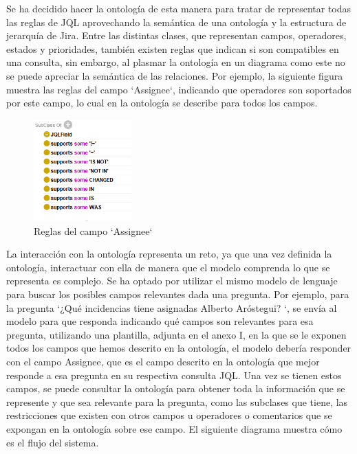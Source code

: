 Se ha decidido hacer la ontología de esta manera para tratar de representar todas las reglas de JQL aprovechando la semántica de una ontología y la estructura de jerarquía de Jira. Entre las distintas clases, que representan campos, operadores, estados y prioridades, también existen reglas que indican si son compatibles en una consulta, sin embargo, al plasmar la ontología en un diagrama como este no se puede apreciar la semántica de las relaciones. Por ejemplo, la siguiente figura muestra las reglas del campo `Assignee`, indicando que operadores son soportados por este campo, lo cual en la ontología se describe para todos los campos.

\begin{figure}[H]
    \centering
    \includegraphics[width=0.335\textwidth]{images/supports_assignee.png}
    \caption{Reglas del campo `Assignee`}\label{fig:assignee_supports}
\end{figure}


La interacción con la ontología representa un reto, ya que una vez definida la ontología, interactuar con ella de manera que el modelo comprenda lo que se representa es complejo. Se ha optado por utilizar el mismo modelo de lenguaje para buscar los posibles campos relevantes dada una pregunta. Por ejemplo, para la pregunta `¿Qué incidencias tiene asignadas Alberto Aróstegui? `, se envía al modelo para que responda indicando qué campos son relevantes para esa pregunta, utilizando una plantilla, adjunta en el anexo I, en la que se le exponen todos los campos que hemos descrito en la ontología, el modelo debería responder con el campo Assignee, que es el campo descrito en la ontología que mejor responde a esa pregunta en su respectiva consulta JQL. Una vez se tienen estos campos, se puede consultar la ontología para obtener toda la información que se represente y que sea relevante para la pregunta, como las subclases que tiene, las restricciones que existen con otros campos u operadores o comentarios que se expongan en la ontología sobre ese campo. El siguiente diagrama muestra cómo es el flujo del sistema.

